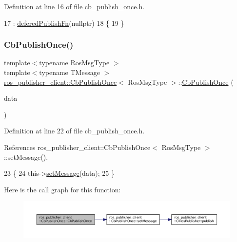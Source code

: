Definition at line 16 of file cb\+\_\+publish\+\_\+once.\+h.


\begin{DoxyCode}
17         : \hyperlink{classros__publisher__client_1_1CbPublishOnce_a91e0e3d574d25e160bcb3a4ca81bb0b2}{deferedPublishFn}(\textcolor{keyword}{nullptr})
18     \{
19     \}
\end{DoxyCode}
\mbox{\label{classros__publisher__client_1_1CbPublishOnce_a354897ea9a30ab5d95acc8837bf9ef0f}} 
\subsubsection{\texorpdfstring{Cb\+Publish\+Once()}{CbPublishOnce()}\hspace{0.1cm}{\footnotesize\ttfamily [2/2]}}
{\footnotesize\ttfamily template$<$typename Ros\+Msg\+Type $>$ \\
template$<$typename T\+Message $>$ \\
\hyperlink{classros__publisher__client_1_1CbPublishOnce}{ros\+\_\+publisher\+\_\+client\+::\+Cb\+Publish\+Once}$<$ Ros\+Msg\+Type $>$\+::\hyperlink{classros__publisher__client_1_1CbPublishOnce}{Cb\+Publish\+Once} (\begin{DoxyParamCaption}\item[{const T\+Message \&}]{data }\end{DoxyParamCaption})\hspace{0.3cm}{\ttfamily [inline]}}



Definition at line 22 of file cb\+\_\+publish\+\_\+once.\+h.



References ros\+\_\+publisher\+\_\+client\+::\+Cb\+Publish\+Once$<$ Ros\+Msg\+Type $>$\+::set\+Message().


\begin{DoxyCode}
23     \{
24         this->\hyperlink{classros__publisher__client_1_1CbPublishOnce_a06bef500e116390ee85a790401e600d8}{setMessage}(data);
25     \}
\end{DoxyCode}
Here is the call graph for this function\+:
\nopagebreak
\begin{figure}[H]
\begin{center}
\leavevmode
\includegraphics[width=350pt]{classros__publisher__client_1_1CbPublishOnce_a354897ea9a30ab5d95acc8837bf9ef0f_cgraph}
\end{center}
\end{figure}



